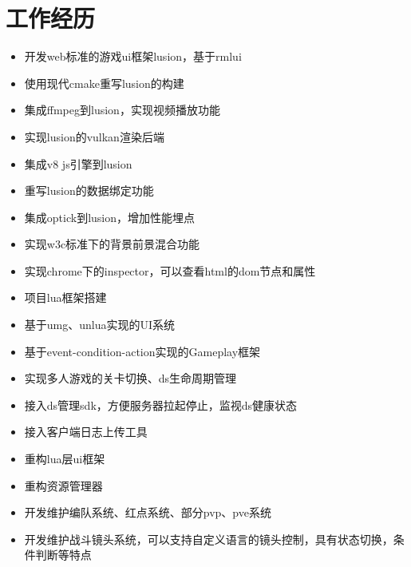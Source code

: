 \documentclass{resume}
\begin{document}
\section{工作经历}
\begin{itemize}
  \item 开发web标准的游戏ui框架lusion，基于rmlui
  \item 使用现代cmake重写lusion的构建
  \item 集成ffmpeg到lusion，实现视频播放功能
  \item 实现lusion的vulkan渲染后端
  \item 集成v8 js引擎到lusion
  \item 重写lusion的数据绑定功能
  \item 集成optick到lusion，增加性能埋点
  \item 实现w3c标准下的背景前景混合功能
  \item 实现chrome下的inspector，可以查看html的dom节点和属性
\end{itemize}
\begin{itemize}
  \item 项目lua框架搭建
  \item 基于umg、unlua实现的UI系统
  \item 基于event-condition-action实现的Gameplay框架
  \item 实现多人游戏的关卡切换、ds生命周期管理
  \item 接入ds管理sdk，方便服务器拉起停止，监视ds健康状态
  \item 接入客户端日志上传工具
\end{itemize}
\begin{itemize}
  \item 重构lua层ui框架
  \item 重构资源管理器
  \item 开发维护编队系统、红点系统、部分pvp、pve系统
  \item 开发维护战斗镜头系统，可以支持自定义语言的镜头控制，具有状态切换，条件判断等特点
\end{itemize}



%
%
\end{document}
